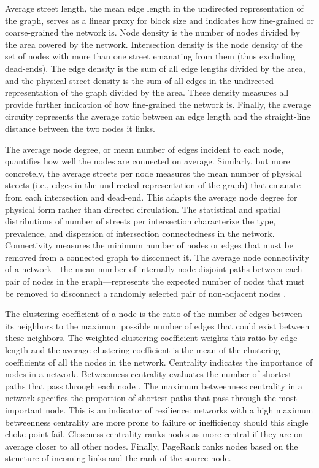 \documentclass[Afour,sageh,times]{sage/sagej}
\begin{document}
Average street length, the mean edge length in the undirected representation of the graph, serves as a linear proxy for block size and indicates how fine-grained or coarse-grained the network is. Node density is the number of nodes divided by the area covered by the network. Intersection density is the node density of the set of nodes with more than one street emanating from them (thus excluding dead-ends). The edge density is the sum of all edge lengths divided by the area, and the physical street density is the sum of all edges in the undirected representation of the graph divided by the area. These density measures all provide further indication of how fine-grained the network is. Finally, the average circuity represents the average ratio between an edge length and the straight-line distance between the two nodes it links.

The average node degree, or mean number of edges incident to each node, quantifies how well the nodes are connected on average. Similarly, but more concretely, the average streets per node measures the mean number of physical streets (i.e., edges in the undirected representation of the graph) that emanate from each intersection and dead-end. This adapts the average node degree for physical form rather than directed circulation. The statistical and spatial distributions of number of streets per intersection characterize the type, prevalence, and dispersion of intersection connectedness in the network. Connectivity measures the minimum number of nodes or edges that must be removed from a connected graph to disconnect it. The average node connectivity of a network---the mean number of internally node-disjoint paths between each pair of nodes in the graph---represents the expected number of nodes that must be removed to disconnect a randomly selected pair of non-adjacent nodes \cite{beineke_average_2002}. 

The clustering coefficient of a node is the ratio of the number of edges between its neighbors to the maximum possible number of edges that could exist between these neighbors. The weighted clustering coefficient weights this ratio by edge length and the average clustering coefficient is the mean of the clustering coefficients of all the nodes in the network. Centrality indicates the importance of nodes in a network. Betweenness centrality evaluates the number of shortest paths that pass through each node \cite{barthelemy_betweenness_2004}. The maximum betweenness centrality in a network specifies the proportion of shortest paths that pass through the most important node. This is an indicator of resilience: networks with a high maximum betweenness centrality are more prone to failure or inefficiency should this single choke point fail. Closeness centrality ranks nodes as more central if they are on average closer to all other nodes. Finally, PageRank ranks nodes based on the structure of incoming links and the rank of the source node.
\end{document}
